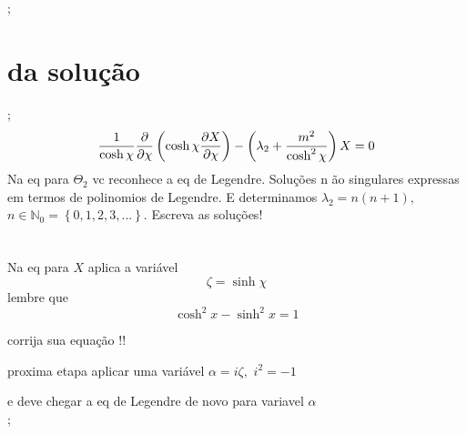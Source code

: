 \documentclass[a4paper,12pt]{article}
\begin{document}
;

\section{da solu\c{c}\~{a}o}

;%
\begin{equation*}
\frac{1}{\cosh \chi }\frac{\partial }{\partial \chi }\left( \cosh \chi \frac{%
\partial X}{\partial \chi }\right) -\left( \lambda _{2}+\frac{m^{2}}{\cosh
^{2}\chi }\right) X=0
\end{equation*}%
Na eq para $\Theta _{2}$ vc reconhece a eq de Legendre. Solu\c{c}\~{o}es n%
\~{a}o singulares expressas em termos de polinomios de Legendre. E
determinamos $\lambda _{2}=n\left( n+1\right) ,$ $n\in \mathbb{N}%
_{0}=\left\{ 0,1,2,3,...\right\} .$ Escreva as solu\c{c}\~{o}es!

$\frac{{}}{{}}$

Na eq para $X$ aplica a vari\'{a}vel 
\begin{equation*}
\zeta =\sinh \chi 
\end{equation*}%
lembre que 
\begin{equation*}
\cosh ^{2}x-\sinh ^{2}x=1
\end{equation*}

corrija sua equa\c{c}\~{a}o !!

proxima etapa aplicar uma vari\'{a}vel $\alpha =i\zeta ,$ $i^{2}=-1$ 

e deve chegar a eq de Legendre de novo para variavel $\alpha $%
\begin{equation*}
\end{equation*}%
;
\end{document}
